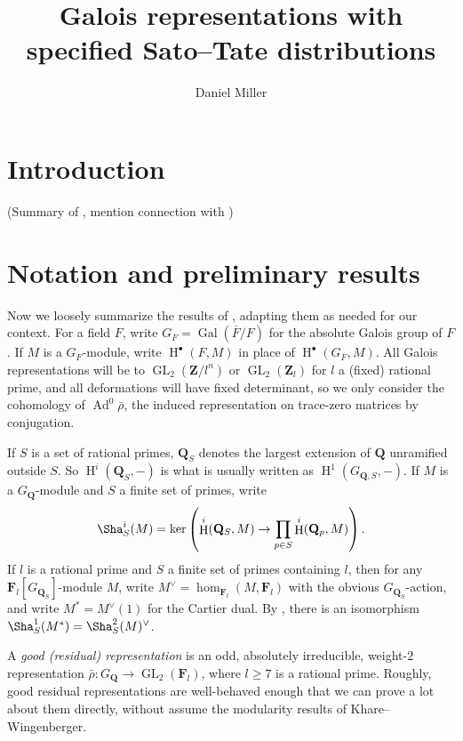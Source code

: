 \documentclass{article}
\title{Galois representations with specified Sato--Tate distributions}
\author{Daniel Miller}
\DeclareMathOperator{\Ad}{Ad}
\DeclareMathOperator{\Gal}{Gal}
\DeclareMathOperator{\GL}{GL}
\DeclareMathOperator{\h}{H}
\newcommand{\bF}{\mathbf{F}}
\newcommand{\bQ}{\mathbf{Q}}
\newcommand{\bZ}{\mathbf{Z}}
\begin{document}
\maketitle





\section{Introduction}

(Summary of \cite{pande}, mention connection with \cite{at,mazur})





\section{Notation and preliminary results}

Now we loosely summarize the results of \cite{klr}, adapting them as needed for 
our context. For a field $F$, write $G_F = \Gal(\overline F / F)$ for the 
absolute Galois group of $F$. If $M$ is a $G_F$-module,  write 
$\h^\bullet(F,M)$ in place of $\h^\bullet(G_F,M)$. All Galois representations 
will be to $\GL_2(\bZ/l^n)$ or $\GL_2(\bZ_l)$ for $l$ a (fixed) rational prime, 
and all deformations will have fixed determinant, so we only consider the 
cohomology of $\Ad^0\bar\rho$, the induced representation on trace-zero 
matrices by conjugation. 

If $S$ is a set of rational primes, $\bQ_S$ denotes the largest extension of 
$\bQ$ unramified outside $S$. So $\h^i(\bQ_S,-)$ is what is usually written as 
$\h^1(G_{\bQ,S},-)$. If $M$ is a $G_\bQ$-module and $S$ a finite set of primes, 
write 
\[
	\Sha^i_S(M) = \ker\left( \h^i(\bQ_S,M) \to \prod_{p\in S} \h^i(\bQ_p,M)\right) .
\]
If $l$ is a rational prime and $S$ a finite set of primes containing $l$, then 
for any $\bF_l[G_{\bQ_S}]$-module $M$, write $M^\vee=\hom_{\bF_l}(M,\bF_l)$ 
with the obvious $G_{\bQ_S}$-action, and write $M^\ast = M^\vee(1)$ for the 
Cartier dual. By \cite[Th.~8.6.7]{nsw}, there is an 
isomorphism $\Sha^1_S(M^\ast) = \Sha_S^2(M)^\vee$. 


A \emph{good (residual) representation} is an odd, absolutely irreducible, 
weight-$2$ representation $\bar\rho\colon G_\bQ \to \GL_2(\bF_l)$, where 
$l\geqslant 7$ is a rational prime. Roughly, good residual representations are 
well-behaved enough that we can prove a lot about them directly, without 
assume the modularity results of Khare--Wingenberger. 
\end{document}
